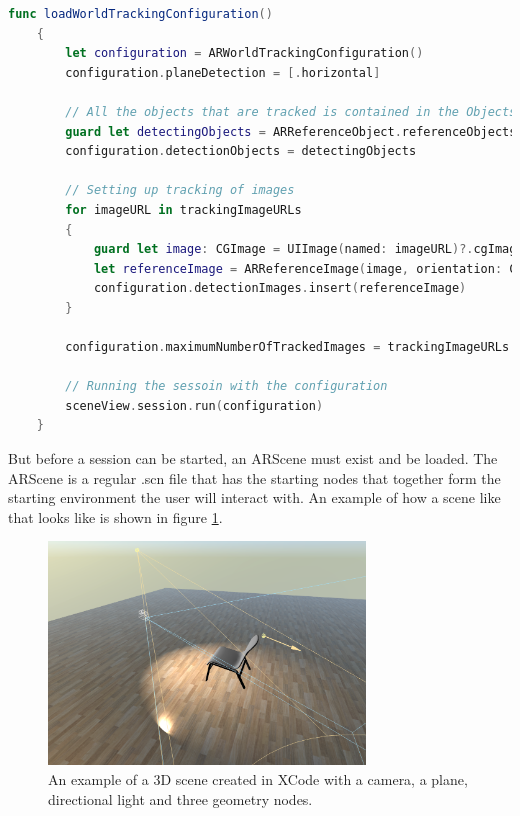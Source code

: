 \begin{lstlisting}[language=swift]
func loadWorldTrackingConfiguration()
    {
        let configuration = ARWorldTrackingConfiguration()
        configuration.planeDetection = [.horizontal]

        // All the objects that are tracked is contained in the Objects folder
        guard let detectingObjects = ARReferenceObject.referenceObjects(inGroupNamed: "Objects", bundle: nil) else { return }
        configuration.detectionObjects = detectingObjects
        
        // Setting up tracking of images
        for imageURL in trackingImageURLs
        {
            guard let image: CGImage = UIImage(named: imageURL)?.cgImage else { return }
            let referenceImage = ARReferenceImage(image, orientation: CGImagePropertyOrientation.up, physicalWidth: 0.3)
            configuration.detectionImages.insert(referenceImage)
        }

        configuration.maximumNumberOfTrackedImages = trackingImageURLs.count
        
        // Running the sessoin with the configuration
        sceneView.session.run(configuration)
    }
\end{lstlisting}

But before a session can be started, an ARScene must exist and be loaded. The ARScene is a regular .scn file that has the starting nodes that together form the starting
environment the user will interact with. An example of how a scene like that looks like is shown in figure \ref{fig:3dsceneImage}.

\begin{figure}[hbtp]
\begin{center}
\includegraphics[width = 0.75\textwidth]{./Images/3dscene.jpg} 
\caption{An example of a 3D scene created in XCode with a camera, a plane, directional light and three geometry nodes.}
\label{fig:3dsceneImage}
\end{center}
\end{figure}

